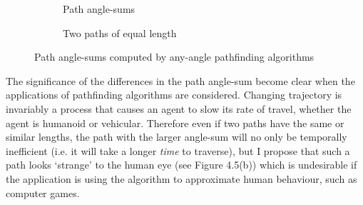 \documentclass[12pt,notitlepage]{report}
\begin{document}
\begin{figure}
\centering
  \begin{subfigure}[b]{0.49\textwidth}
  \centering
  
  \caption{Path angle-sums}
  \end{subfigure}
  \begin{subfigure}[b]{0.49\textwidth}
  \centering
  \caption{Two paths of equal length}
  \end{subfigure}
\caption{Path angle-sums computed by any-angle pathfinding algorithms}
\end{figure}

\noindent
The significance of the differences in the path angle-sum become clear when the applications of pathfinding algorithms are considered. Changing trajectory is invariably a process that causes an agent to slow its rate of travel, whether the agent is humanoid or vehicular. Therefore even if two paths have the same or similar lengths, the path with the larger angle-sum will no only be temporally inefficient (i.e. it will take a longer {\em time} to traverse), but I propose that such a path looks `strange' to the human eye (see Figure 4.5(b)) which is undesirable if the application is using the algorithm to approximate human behaviour, such as computer games.\\
\end{document}
